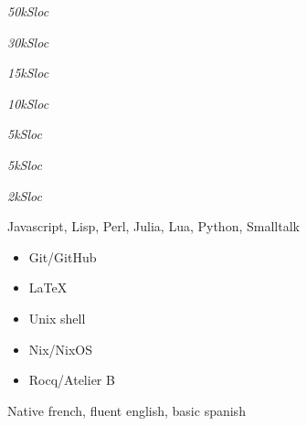 \documentclass[a4paper,11pt]{extarticle}
\begin{document}
\begin{minipage}[c]{0.35\linewidth}
\begin{tcolorbox}
        \vspace{-0.1cm}
        \begin{description}\setlength{\itemsep}{0em}
          \item[C/C++]\hfill\emph{50kSloc}
          \item[Haskell]\hfill\emph{30kSloc}
          \item[Nix]\hfill\emph{15kSloc}
          \item[Rust]\hfill\emph{10kSloc}
          \item[OCaml]\hfill\emph{5kSloc}
          \item[Rocq]\hfill\emph{5kSloc}
          \item[Prolog]\hfill\emph{2kSloc}
          \item[Other] Javascript, Lisp, Perl, Julia, Lua, Python, Smalltalk
        \end{description}

        \vspace{-0.1cm}

        \begin{itemize}[label={\color{mainbg}$\bullet$},leftmargin=0em]
          \setlength{\itemsep}{0cm}
          \item Git/GitHub
          \item \LaTeX
          \item Unix shell
          \item Nix/NixOS
          \item Rocq/Atelier B
        \end{itemize}

        \vspace{-0.1cm}

        Native french, fluent english, basic spanish


    \end{tcolorbox}\end{minipage}
    \hfill
\end{document}
